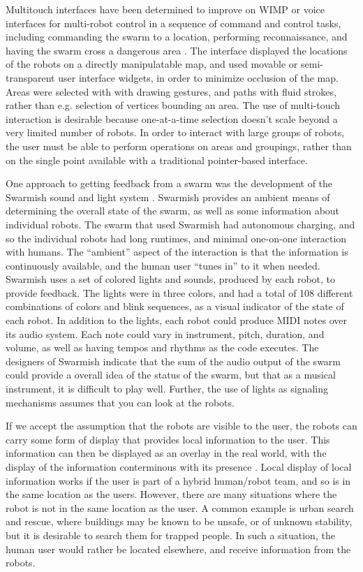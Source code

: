 Multitouch interfaces have been determined to improve on WIMP or voice interfaces for multi-robot control in a sequence of command and control tasks, including commanding the swarm to a location, performing reconnaissance, and having the swarm cross a dangerous area \citep{hayes2010multi}.
The interface displayed the locations of the robots on a directly manipulatable map, and used movable or semi-transparent user interface widgets, in order to minimize occlusion of the map. 
Areas were selected with with drawing gestures, and paths with fluid strokes, rather than e.g. selection of vertices bounding an area.
The use of multi-touch interaction is desirable because one-at-a-time selection doesn't scale beyond a very limited number of robots.
In order to interact with large groups of robots, the user must be able to perform operations on areas and groupings, rather than on the single point available with a traditional pointer-based interface. 

One approach to getting feedback from a swarm was the development of the Swarmish sound and light system \citep{mclurkin2006speaking}. 
Swarmish provides an ambient means of determining the overall state of the swarm, as well as some information about individual robots. 
The swarm that used Swarmish had autonomous charging, and so the individual robots had long runtimes, and minimal one-on-one interaction with humans. 
The ``ambient'' aspect of the interaction is that the information is continuously available, and the human user ``tunes in'' to it when needed. 
Swarmish uses a set of colored lights and sounds, produced by each robot, to provide feedback. 
The lights were in three colors, and had a total of 108 different combinations of colors and blink sequences, as a visual indicator of the state of each robot. 
In addition to the lights, each robot could produce MIDI notes over its audio system. 
Each note could vary in instrument, pitch, duration, and volume, as well as having tempos and rhythms as the code executes. 
The designers of Swarmish indicate that the sum of the audio output of the swarm could provide a overall idea of the status of the swarm, but that as a musical instrument, it is difficult to play well. 
Further, the use of lights as signaling mechanisms assumes that you can look at the robots. 

If we accept the assumption that the robots are visible to the user, the robots can carry some form of display that provides local information to the user. 
This information can then be displayed as an overlay in the real world, with the display of the information conterminous with its presence \citep{Daily:2003:WEI:820752.821587}. 
Local display of local information works if the user is part of a hybrid human/robot team, and so is in the same location as the users. 
However, there are many situations where the robot is not in the same location as the user. 
A common example is urban search and rescue, where buildings may be known to be unsafe, or of unknown stability, but it is desirable to search them for trapped people. 
In such a situation, the human user would rather be located elsewhere, and receive information from the robots. 

